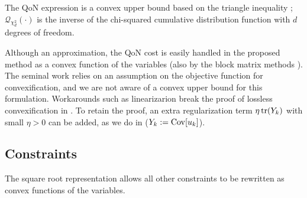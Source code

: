 The QoN expression is a convex upper bound based on the triangle inequality \cite{oguriChanceConstrainedControlSafe2024a}; \( \mathcal{Q}_{\chi^2_d}(\cdot) \) is the inverse of the chi-squared cumulative distribution function with \( d \) degrees of freedom.

\begin{remark} \label{remark:convexifying_term}
	Although an approximation, the QoN cost is easily handled in the proposed method as a convex function of the variables (also by the block matrix methods \cite{ridderhofChanceConstrainedCovarianceControl2020,oguriChanceConstrainedControlSafe2024a}). The seminal work \cite{liuOptimalCovarianceSteering2025} relies on an assumption on the objective function for convexification, and we are not aware of a convex upper bound for this formulation. Workarounds such as linearizarion break the proof of lossless convexification in \cite{liuOptimalCovarianceSteering2025}. To retain the proof, an extra regularization term \(\eta \trace(Y_k)\) with small \( \eta > 0 \) can be added, as we do in \cite{kumagaiRobustCislunarLowThrust2025} ($Y_k := \mathrm{Cov}[u_k ]$).
\end{remark}

\subsection{Constraints}
The square root representation allows all other constraints to be rewritten as convex functions of the variables.

